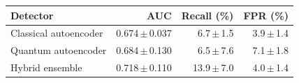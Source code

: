 \begin{tabular}{lrrr}
\toprule
Detector & AUC & Recall (\%) & FPR (\%) \\
\midrule
Classical autoencoder & 0.674\,$\pm$\,0.037 & 6.7\,$\pm$\,1.5 & 3.9\,$\pm$\,1.4 \\
Quantum autoencoder & 0.684\,$\pm$\,0.130 & 6.5\,$\pm$\,7.6 & 7.1\,$\pm$\,1.8 \\
Hybrid ensemble & 0.718\,$\pm$\,0.110 & 13.9\,$\pm$\,7.0 & 4.0\,$\pm$\,1.4 \\
\bottomrule
\end{tabular}
